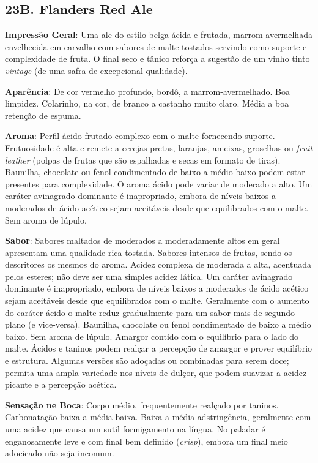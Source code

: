 \subsection*{23B. Flanders Red Ale}

\textbf{Impressão Geral}: Uma ale do estilo belga ácida e frutada, marrom-avermelhada envelhecida em carvalho com sabores de malte tostados servindo como suporte e complexidade de fruta. O final seco e tânico reforça a sugestão de um vinho tinto \textit{vintage} (de uma safra de excepcional qualidade).

\textbf{Aparência}: De cor vermelho profundo, bordô, a marrom-avermelhado. Boa limpidez. Colarinho, na cor, de branco a castanho muito claro. Média a boa retenção de espuma.

\textbf{Aroma}: Perfil ácido-frutado complexo com o malte fornecendo suporte. Frutuosidade é alta e remete a cerejas pretas, laranjas, ameixas, groselhas ou \textit{fruit leather} (polpas de frutas que são espalhadas e secas em formato de tiras). Baunilha, chocolate ou fenol condimentado de baixo a médio baixo podem estar presentes para complexidade. O aroma ácido pode variar de moderado a alto. Um caráter avinagrado dominante é inapropriado, embora de níveis baixos a moderados de ácido acético sejam aceitáveis desde que equilibrados com o malte. Sem aroma de lúpulo.

\textbf{Sabor}: Sabores maltados de moderados a moderadamente altos em geral apresentam uma qualidade rica-tostada. Sabores intensos de frutas, sendo os descritores os mesmos do aroma. Acidez complexa de moderada a alta, acentuada pelos esteres; não deve ser uma simples acidez lática. Um caráter avinagrado dominante é inapropriado, embora de níveis baixos a moderados de ácido acético sejam aceitáveis desde que equilibrados com o malte. Geralmente com o aumento do caráter ácido o malte reduz gradualmente para um sabor mais de segundo plano (e vice-versa). Baunilha, chocolate ou fenol condimentado de baixo a médio baixo. Sem aroma de lúpulo. Amargor contido com o equilíbrio para o lado do malte. Ácidos e taninos podem realçar a percepção de amargor e prover equilíbrio e estrutura. Algumas versões são adoçadas ou combinadas para serem doce; permita uma ampla variedade nos níveis de dulçor, que podem suavizar a acidez picante e a percepção acética.

\textbf{Sensação ne Boca}: Corpo médio, frequentemente realçado por taninos. Carbonatação baixa a média baixa. Baixa a média adstringência, geralmente com uma acidez que causa um sutil formigamento na língua. No paladar é enganosamente leve e com final bem definido (\textit{crisp}), embora um final meio adocicado não seja incomum.

